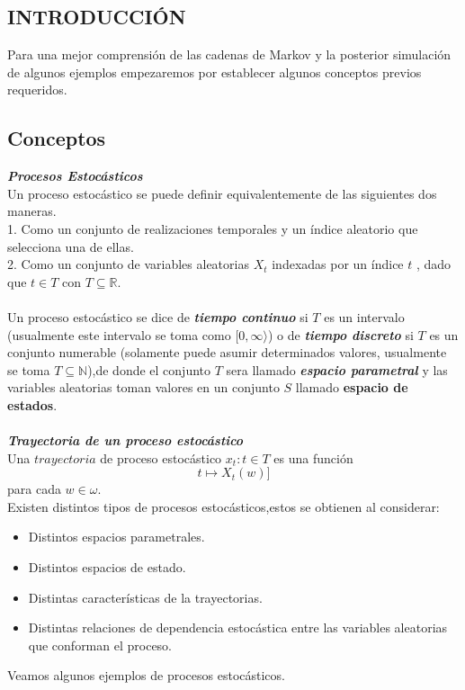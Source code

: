 \documentclass[10pt,a4paper]{article}
\theoremstyle{definition}
\theoremstyle{remark}
\begin{document}
\begin{multicols}{2}
\section{INTRODUCCIÓN}
Para una mejor comprensión de las cadenas de Markov y la posterior simulación de algunos ejemplos empezaremos por establecer algunos conceptos previos requeridos.
\subsection{Conceptos}
\textbf{\textit{Procesos Estocásticos}}\\
Un proceso estocástico se puede definir equivalentemente de las siguientes dos maneras.\\
1. Como un conjunto de realizaciones temporales y un índice aleatorio que selecciona una 
de ellas.\\
2. Como un conjunto de variables aleatorias $X_{t}$ indexadas por un índice $t$ , dado que $t \in T$ con $T\subseteq \mathbb{R} $.\\\\
Un proceso estocástico se dice de \textbf{\textit{tiempo continuo}} si $T$ es un intervalo (usualmente este intervalo se toma como $[0,\infty\rangle$) o de \textbf{\textit{tiempo discreto}} si $T$ es un conjunto numerable (solamente puede asumir determinados valores, usualmente se toma $T 
\subseteq \mathbb{N}$),de donde el conjunto $T$ sera llamado \textbf{\textit{espacio 
parametral}} y las variables aleatorias toman valores en un conjunto $S$ llamado 
\textbf{espacio de estados}.\\
\\
\textbf{\textit{Trayectoria de un proceso estocástico}}\\
Una $trayectoria$ de proceso estocástico $x_{t}: t \in T$ es una función $$t 
\longmapsto X_{t}(w)]$$ para cada $w \in \omega.$\\
Existen distintos tipos de procesos estocásticos,estos se obtienen al considerar:
\begin{itemize}
	\item Distintos espacios parametrales.
	\item Distintos espacios de estado.
	\item Distintas características de la trayectorias.
	\item Distintas relaciones de dependencia estocástica entre las variables aleatorias 
	que conforman el proceso.
\end{itemize}
Veamos algunos ejemplos de procesos estocásticos.

\end{multicols}
\end{document}
